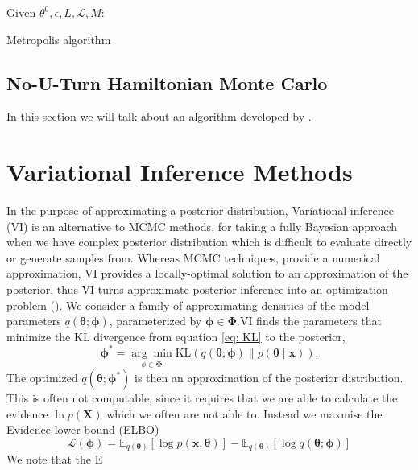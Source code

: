 \begin{algorithm}[h!]\label{algo_2}

\SetAlgoLined
$\text{Given } \theta^{0}, \epsilon, L, \mathcal{L}, M$:
\caption{Metropolis algorithm}
\end{algorithm}







\subsection{No-U-Turn Hamiltonian Monte Carlo}
In this section we will talk about an algorithm developed by \cite{hoffman2011nouturn}.


\section{Variational Inference Methods}
In the purpose of approximating a posterior distribution,  Variational inference (VI) is an alternative to MCMC methods, for taking a fully Bayesian approach when we have complex posterior distribution which is difficult to evaluate directly or generate samples from. Whereas MCMC techniques, provide a numerical approximation, VI provides a locally-optimal solution to an approximation of the posterior, thus VI turns approximate posterior inference into an optimization problem (\cite{VI}). We consider a family of approximating densities of the model parameters $q(\boldsymbol{\theta} ; \boldsymbol{\phi})$, parameterized by $\boldsymbol{\phi} \in \boldsymbol{\Phi}$.VI finds the parameters that minimize the KL divergence from equation \ref{eq: KL} to the posterior,
$$
\boldsymbol{\phi}^{*}=\underset{\phi \in \boldsymbol{\Phi}}{\arg \min } \mathrm{KL}(q(\boldsymbol{\theta} ; \boldsymbol{\phi}) \| p(\boldsymbol{\theta} \mid \boldsymbol{x})) .
$$
The optimized $q(\boldsymbol{\theta};\boldsymbol{\phi}^{*})$ is then an approximation of the posterior distribution. This is often not computable, since it requires that we are able to calculate the evidence $\ln p(\boldsymbol{X})$ which we often are not able to. Instead we maxmise the Evidence lower bound (ELBO)
\begin{equation*}
    \mathscr{L}(\boldsymbol{\phi})=\mathbb{E}_{q(\boldsymbol{\theta})}[\log p(\boldsymbol{x}, \boldsymbol{\theta})]-\mathbb{E}_{q(\boldsymbol{\theta})}[\log q(\boldsymbol{\theta} ; \boldsymbol{\phi})]
\end{equation*}
We note that the E


